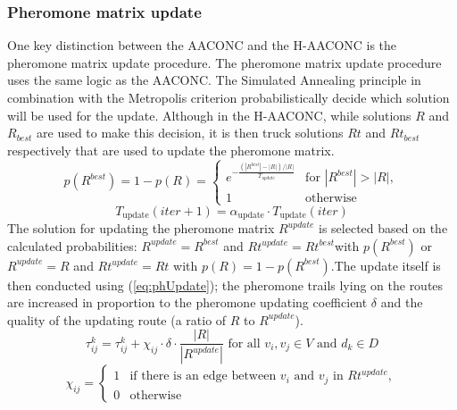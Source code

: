 \documentclass{article}
\begin{document}
	\subsubsection{Pheromone matrix update}
	One key distinction between the AACONC and the H-AACONC is the pheromone matrix update procedure.
	The pheromone matrix update procedure uses the same logic as the AACONC. The Simulated Annealing principle in combination with the Metropolis criterion probabilistically decide which solution will be used for the update. Although in the H-AACONC, while solutions $R$ and $R_{best}$ are used to make this decision, it is then truck solutions $Rt$ and $Rt_{best}$ respectively that are used to update the pheromone matrix.
	\begin{equation}
		p(R^{best}) = 1 - p(R) = 
		\begin{cases}
			e^{-\frac{(|R^{best}| - |R|)/|R|}{T_{update}}} & \text{for } |R^{best}| > |R|, \\
			1 & \text{otherwise}
		\end{cases}
		\label{eq:SA}
	\end{equation}
	\begin{equation}
		T_{\text{update}}(iter + 1) = \alpha_{\text{update}} \cdot T_{\text{update}}(iter)
		\label{eq:Tupdate}
	\end{equation}
	The solution for updating the pheromone matrix $R^{update}$ is selected based on the calculated probabilities:
	$R^{update} = R^{best}$ and $Rt^{update} = Rt^{best}$with $p(R^{best})$ or $R^{update} = R$ and $Rt^{update} = Rt$ with $p(R) = 1 - p(R^{best})$.The update itself is then conducted using (\ref{eq:phUpdate}); the pheromone trails lying on the routes are increased in proportion to the pheromone
	updating coefficient $\delta$ and the quality of the updating route (a ratio of $R$ to $R^{update}$).
	\begin{equation}
		\tau_{ij}^k = \tau_{ij}^k + \chi_{ij}\cdot \delta \cdot \frac{|R|}{|R^{update}|} \text{ for all } v_i,v_j \in V \text{ and } d_k\in D
		\label{eq:phUpdate}
	\end{equation}
	\begin{equation}
		\chi_{ij} = 
		\begin{cases}
			1 & \text{if there is an edge between }v_i \text{ and }v_j \text{ in }Rt^{update},\\
			0 & \text{otherwise}
		\end{cases}
	\end{equation}
	\;
	\clearpage
	\printbibliography
	
\end{document}
